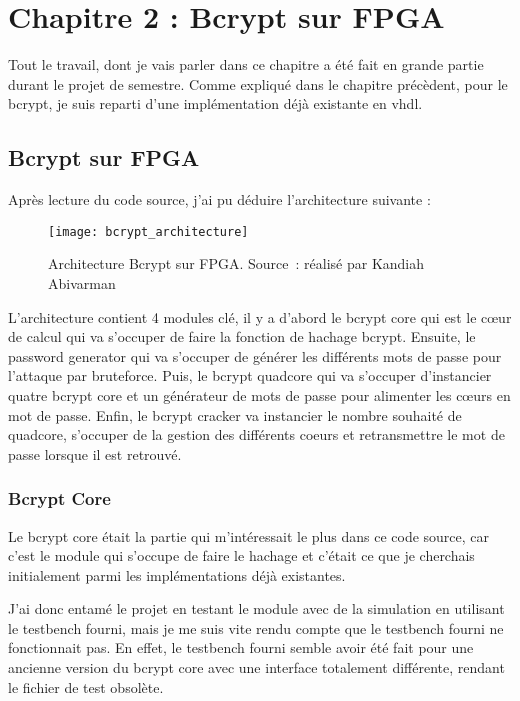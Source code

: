 \chapter{Chapitre 2 : Bcrypt sur FPGA}

Tout le travail, dont je vais parler dans ce chapitre a été fait en grande partie durant le projet de semestre.
Comme expliqué dans le chapitre précèdent, pour le bcrypt, je suis reparti d'une implémentation déjà existante en \gls{vhdl}.

\section{Bcrypt sur FPGA}

Après lecture du code source, j'ai pu déduire l'architecture suivante :

\begin{figure}[tbph!]
	\centering
	\texttt{[image: bcrypt\_architecture]}
	\caption[Architecture Bcrypt sur FPGA]{Architecture Bcrypt sur FPGA. Source : réalisé par Kandiah Abivarman}
	\label{fig:bcrypt_architecture}
\end{figure}

L'architecture contient 4 modules clé, il y a d'abord le bcrypt core qui est le cœur de calcul qui va s'occuper de faire la fonction de hachage bcrypt. 
Ensuite, le password generator qui va s'occuper de générer les différents mots de passe pour l'attaque par bruteforce. 
Puis, le bcrypt quadcore qui va s'occuper d'instancier quatre bcrypt core et un générateur de mots de passe pour alimenter les cœurs en mot de passe. 
Enfin, le bcrypt cracker va instancier le nombre souhaité de quadcore, s'occuper de la gestion des différents coeurs et retransmettre le mot de passe lorsque il est retrouvé.

\subsection{Bcrypt Core}

Le bcrypt core était la partie qui m'intéressait le plus dans ce code source, car c'est le module qui s'occupe de faire le hachage et c'était ce que je cherchais initialement parmi les implémentations déjà existantes.

J'ai donc entamé le projet en testant le module avec de la simulation en utilisant le testbench fourni, mais je me suis vite rendu compte que le testbench fourni ne fonctionnait pas. 
En effet, le testbench fourni semble avoir été fait pour une ancienne version du bcrypt core avec une interface totalement différente, rendant le fichier de test obsolète.


